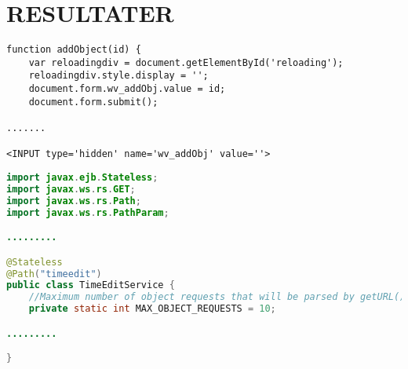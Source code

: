 \documentclass[../main.tex]{subfiles}
\begin{document}
\section{RESULTATER}



\begin{lstlisting}[frame=single]
function addObject(id) {
	var reloadingdiv = document.getElementById('reloading');
	reloadingdiv.style.display = '';
	document.form.wv_addObj.value = id;
	document.form.submit();

.......

<INPUT type='hidden' name='wv_addObj' value=''>
\end{lstlisting}


\begin{lstlisting}[language=Java, frame=single, caption={Descriptive Caption Text}]
import javax.ejb.Stateless;
import javax.ws.rs.GET;
import javax.ws.rs.Path;
import javax.ws.rs.PathParam;

.........

@Stateless
@Path("timeedit")
public class TimeEditService {
    //Maximum number of object requests that will be parsed by getURL()
    private static int MAX_OBJECT_REQUESTS = 10;

.........

}
\end{lstlisting}



\newpage
\end{document}
